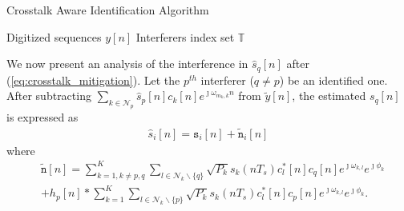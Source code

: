 \documentclass{IEEEtran}
\begin{document}
 \begin{algorithm}
 \caption{Crosstalk Aware Identification Algorithm}
 \begin{algorithmic}[1]
 \renewcommand{\algorithmicrequire}{\textbf{Input:}}
 \renewcommand{\algorithmicensure}{\textbf{Output:}}
	\REQUIRE Digitized sequences $y[n]$
	\ENSURE  Interferers index set $\mathbb{T}$
	\ENDFOR
 \end{algorithmic}
 \end{algorithm}


We now present an analysis of the interference in $\hat{s}_q[n]$ after (\ref{eq:crosstalk_mitigation}). Let the $p^{th}$ interferer ($q\neq p$) be an identified one. After subtracting $\sum_{k\in\mathcal{N}_p}\hat{s}_p[n]c_k[n]e^{\jmath \omega_{m_k,k}n}$ from $\tilde{y}[n]$, the estimated $s_q[n]$ is expressed as 
\begin{align}
\hat{s}_{i}[n] = \mathtt{s}_i[n]+\tilde{\mathtt{n}}_i[n]
\end{align}
where
\begin{align}
&\tilde{\mathtt{n}}[n] = \sum\limits_{k=1,k \neq p,q}^{K}\sum\limits_{l\in \mathcal{N}_k\backslash\{q\}} \sqrt{P_{k}}s_{k}\left(nT_s\right)c^*_l[n]c_q[n]e^{\jmath\omega_{k,l}}e^{\jmath\phi_{k}}\nonumber\\
&+h_p[n]*\sum\limits_{k=1}^{K}\sum\limits_{l\in \mathcal{N}_k\backslash\{p\}} \sqrt{P_{k}}s_{k}\left(nT_s\right)c^*_l[n]c_p[n]e^{\jmath\omega_{k,l}}e^{\jmath\phi_{k}}.
\end{align}
\end{document}
